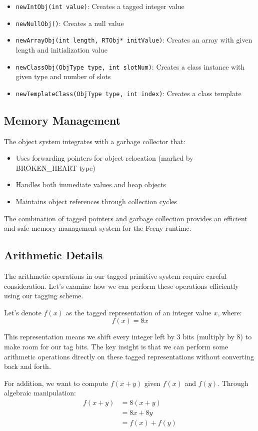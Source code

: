 \documentclass[12pt, a4paper]{article}
\begin{document}
\begin{itemize}
\item \texttt{newIntObj(int value)}: Creates a tagged integer value
\item \texttt{newNullObj()}: Creates a null value
\item \texttt{newArrayObj(int length, RTObj* initValue)}: Creates an array with given length and initialization value
\item \texttt{newClassObj(ObjType type, int slotNum)}: Creates a class instance with given type and number of slots
\item \texttt{newTemplateClass(ObjType type, int index)}: Creates a class template
\end{itemize}

\subsection{Memory Management}
The object system integrates with a garbage collector that:
\begin{itemize}
\item Uses forwarding pointers for object relocation (marked by BROKEN\_HEART type)
\item Handles both immediate values and heap objects
\item Maintains object references through collection cycles
\end{itemize}

The combination of tagged pointers and garbage collection provides an efficient and safe memory management system for the Feeny runtime.
\subsection{Arithmetic Details}

The arithmetic operations in our tagged primitive system require careful consideration. Let's examine how we can perform these operations efficiently using our tagging scheme.

Let's denote $f(x)$ as the tagged representation of an integer value $x$, where:
\[f(x) = 8x\]

This representation means we shift every integer left by 3 bits (multiply by 8) to make room for our tag bits. The key insight is that we can perform some arithmetic operations directly on these tagged representations without converting back and forth.

For addition, we want to compute $f(x + y)$ given $f(x)$ and $f(y)$. Through algebraic manipulation:
\[
\begin{aligned}
f(x + y) &= 8(x + y) \\
&= 8x + 8y \\
&= f(x) + f(y)
\end{aligned}
\]
\end{document}
